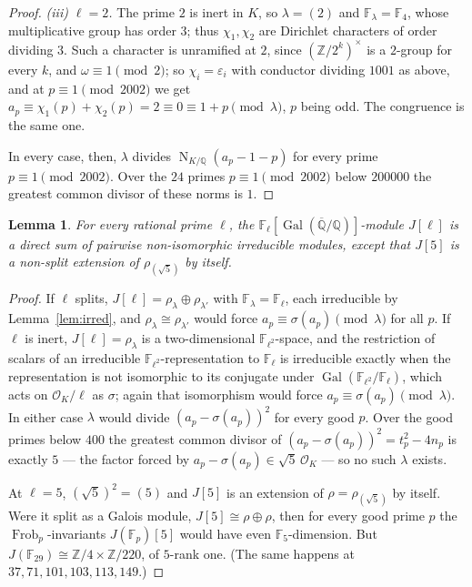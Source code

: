 \documentclass[11pt,reqno]{amsart}
\theoremstyle{plain}
\newtheorem{lemma}[theorem]{Lemma}
\theoremstyle{definition}
\DeclareMathOperator{\Gal}{Gal}
\DeclareMathOperator{\Norm}{N}
\DeclareMathOperator{\Frob}{Frob}
\newcommand{\Q}{\mathbb{Q}}
\newcommand{\Z}{\mathbb{Z}}
\newcommand{\F}{\mathbb{F}}
\newcommand{\Qbar}{\overline{\mathbb{Q}}}
\newcommand{\OK}{\mathcal{O}_K}
\begin{document}
\begin{proof}
\emph{(iii) $\ell=2$.} The prime $2$ is inert in $K$, so $\lambda=(2)$ and $\F_\lambda=\F_4$, whose
multiplicative group has order $3$; thus $\chi_1,\chi_2$ are Dirichlet characters of order dividing
$3$. Such a character is unramified at $2$, since $(\Z/2^k)^\times$ is a $2$-group for every $k$,
and $\omega\equiv1\pmod 2$; so $\chi_i=\varepsilon_i$ with conductor dividing $1001$ as above, and at
$p\equiv1\pmod{2002}$ we get $a_p\equiv\chi_1(p)+\chi_2(p)=2\equiv0\equiv1+p\pmod\lambda$, $p$
being odd. The congruence is the same one.

In every case, then, $\lambda$ divides $\Norm_{K/\Q}(a_p-1-p)$ for every prime
$p\equiv1\pmod{2002}$. Over the $24$ primes $p\equiv1\pmod{2002}$
below $200000$ the greatest common divisor of these norms is $1$.
\end{proof}

\begin{lemma}\label{lem:conj}
For every rational prime $\ell$, the $\F_\ell[\Gal(\Qbar/\Q)]$-module $J[\ell]$ is a direct sum of
pairwise non-isomorphic irreducible modules, except that $J[5]$ is a non-split extension of
$\rho_{(\sqrt5)}$ by itself.
\end{lemma}
\begin{proof}
If $\ell$ splits, $J[\ell]=\rho_\lambda\oplus\rho_{\lambda'}$ with $\F_\lambda=\F_\ell$, each
irreducible by Lemma~\ref{lem:irred}, and $\rho_\lambda\cong\rho_{\lambda'}$ would force $a_p\equiv
\sigma(a_p)\pmod\lambda$ for all $p$. If $\ell$ is inert, $J[\ell]=\rho_\lambda$ is a
two-dimensional $\F_{\ell^2}$-space, and the restriction of scalars of an irreducible
$\F_{\ell^2}$-representation to $\F_\ell$ is irreducible exactly when the representation is not
isomorphic to its conjugate under $\Gal(\F_{\ell^2}/\F_\ell)$, which acts on $\OK/\ell$ as
$\sigma$; again that isomorphism would force $a_p\equiv\sigma(a_p)\pmod\lambda$. In either case
$\lambda$ would divide $(a_p-\sigma(a_p))^2$ for every good $p$. Over the good primes below $400$
the greatest common divisor of $(a_p-\sigma(a_p))^2 = t_p^2-4n_p$ is exactly $5$ --- the factor
forced by $a_p-\sigma(a_p)\in\sqrt5\,\OK$ --- so no such $\lambda$ exists.

At $\ell=5$, $(\sqrt5)^2=(5)$ and $J[5]$ is an extension of $\rho=\rho_{(\sqrt5)}$ by itself. Were
it split as a Galois module, $J[5]\cong\rho\oplus\rho$, then for every good prime $p$ the
$\Frob_p$-invariants $J(\F_p)[5]$ would have even $\F_5$-dimension. But $J(\F_{29})\cong
\Z/4\times\Z/220$, of $5$-rank one. (The same happens at $37, 71, 101, 103, 113, 149$.)
\end{proof}
\end{document}
